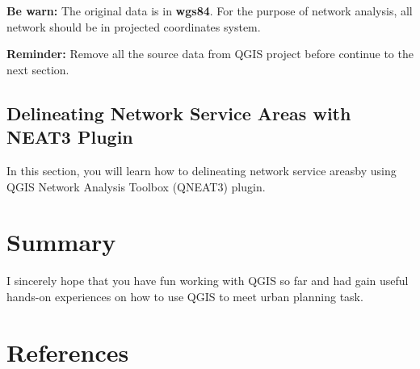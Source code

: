 \documentclass[
  letterpaper,
  DIV=11,
  numbers=noendperiod]{scrreprt}
\newlength{\cslhangindent}
\newlength{\cslentryspacingunit} %
\newenvironment{CSLReferences}[2] %
 {%
  \setlength{\parindent}{0pt}
  \ifodd #1
  \let\oldpar\par
  \def\par{\hangindent=\cslhangindent\oldpar}
  \fi
  \setlength{\parskip}{#2\cslentryspacingunit}
 }%
 {}
\begin{document}
\textbf{Be warn:} The original data is in \textbf{wgs84}. For the
purpose of network analysis, all network should be in projected
coordinates system.

\textbf{Reminder:} Remove all the source data from QGIS project before
continue to the next section.

\hypertarget{delineating-network-service-areas-with-neat3-plugin}{%
\section{Delineating Network Service Areas with NEAT3
Plugin}\label{delineating-network-service-areas-with-neat3-plugin}}

In this section, you will learn how to delineating network service
areasby using QGIS Network Analysis Toolbox (QNEAT3) plugin.


\hypertarget{summary}{%
\chapter{Summary}\label{summary}}

I sincerely hope that you have fun working with QGIS so far and had gain
useful hands-on experiences on how to use QGIS to meet urban planning
task.


\hypertarget{references}{%
\chapter*{References}\label{references}}

\hypertarget{refs}{}
\begin{CSLReferences}{0}{0}
\end{CSLReferences}
\end{document}
